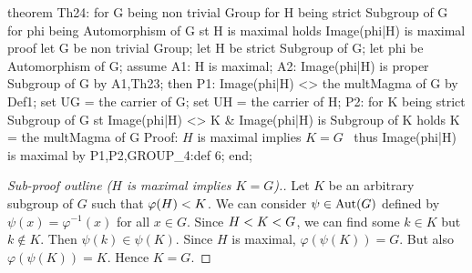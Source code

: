 \nwenddocs{}\endmoddef\nwstartdeflinemarkup{}\nwenddeflinemarkup
theorem Th24:
  for G being non trivial Group
  for H being strict Subgroup of G
  for phi being Automorphism of G
  st H is maximal
  holds Image(phi|H) is maximal
proof
  let G be non trivial Group;
  let H be strict Subgroup of G;
  let phi be Automorphism of G;
  assume A1: H is maximal;
  A2: Image(phi|H) is proper Subgroup of G by A1,Th23;
  then P1: Image(phi|H) <> the multMagma of G by Def1;
  set UG = the carrier of G;
  set UH = the carrier of H;
  P2: for K being strict Subgroup of G
  st Image(phi|H) <> K & Image(phi|H) is Subgroup of K
  holds K = the multMagma of G
  \LA{}Proof: $H$ is maximal implies $K=G$~{\nwtagstyle{}}\RA{}
  thus Image(phi|H) is maximal by P1,P2,GROUP_4:def 6;
end;
\eatline
{}\nwendcode{}\nwdocspar
\begin{proof}[Sub-proof outline ($H$ is maximal implies $K=G$).]
Let $K$ be an arbitrary subgroup of $G$ such that $\varphi(H)< K$.
We can consider $\psi\in\operatorname{Aut}(G)$ defined by $\psi(x)=\varphi^{-1}(x)$
for all $x\in G$. Since $H< K< G$, we can
find some $k\in K$ but $k\notin K$. Then $\psi(k)\in\psi(K)$. Since $H$
is maximal, $\varphi(\psi(K))=G$. But also $\varphi(\psi(K))=K$. Hence $K=G$.
\end{proof}

